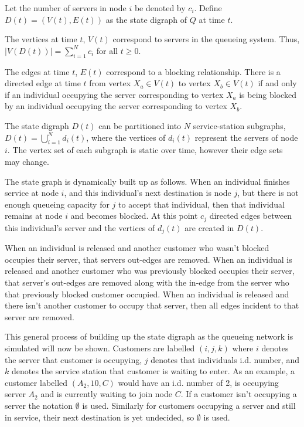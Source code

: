 \documentclass{article}
\begin{document}
Let the number of servers in node $i$ be denoted by $c_i$.
Define $D(t)=(V(t), E(t))$ as the state digraph of $Q$ at time $t$.

The vertices at time \(t\), \(V(t)\) correspond to servers in the
queueing system.
Thus, $\left| V\left(D\left(t\right)\right) \right| = \sum_{i=1}^N c_i$ for all $t \geq 0$.

The edges at time \(t\), \(E(t)\) correspond to a blocking relationship.
There is a directed edge at time \(t\) from vertex \(X_a\in V(t)\) to vertex \(X_b\in
V(t)\) if and only if an individual occupying the server corresponding to vertex
\(X_a\) is being blocked by an individual occupying the server corresponding to
vertex \(X_b\).

The state digraph $D(t)$ can be partitioned into $N$ service-station subgraphs,
$D(t)=\bigcup_{i=1}^N d_i(t)$, where the vertices of $d_i(t)$ represent the servers of node $i$.
The vertex set of each subgraph is static over time, however their edge sets may
change.

The state graph is dynamically built up as follows.
When an individual finishes service at node $i$, and this individual's next destination is node $j$, but there is not enough queueing capacity for $j$ to accept that individual, then that individual remains at node $i$ and becomes blocked.
At this point $c_j$ directed edges between this individual's server and the vertices of $d_j(t)$ are created in $D(t)$.

When an individual is released and another customer who wasn't blocked occupies their server, that servers out-edges are removed.
When an individual is released and another customer who was previously blocked occupies their server, that server's out-edges are removed along with the in-edge from the server who that previously blocked customer occupied.
When an individual is released and there isn't another customer to occupy that server, then all edges incident to that server are removed.

This general process of building up the state digraph as the queueing network is simulated will now be shown.
Customers are labelled $(i, j, k)$ where $i$ denotes the server that customer is occupying, $j$ denotes that individuals i.d. number, and $k$ denotes the service station that customer is waiting to enter.
As an example, a customer labelled $(A_2, 10, C)$ would have an i.d. number of 2, is occupying server $A_2$ and is currently waiting to join node $C$.
If a customer isn't occupying a server the notation $\emptyset$ is used.
Similarly for customers occupying a server and still in service, their next destination is yet undecided, so $\emptyset$ is used.
\end{document}
